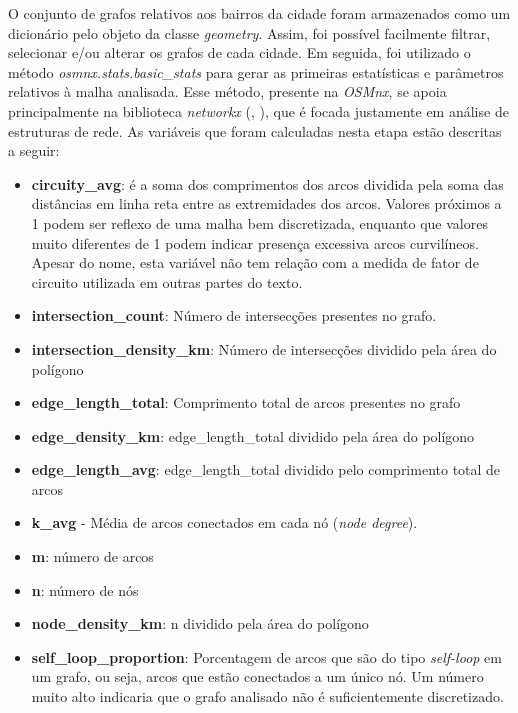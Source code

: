 O conjunto de grafos relativos aos bairros da cidade foram armazenados como um dicionário pelo objeto da classe \textit{geometry}.
Assim, foi possível facilmente filtrar, selecionar e/ou alterar os grafos de cada cidade.
Em seguida, foi utilizado o método \textit{osmnx.stats.basic\_stats} para gerar as primeiras estatísticas e parâmetros relativos à malha analisada.
Esse método, presente na \textit{OSMnx}, se apoia principalmente na biblioteca \textit{networkx} (, \citeyear{hagberg2008exploring}), que é focada justamente em análise de estruturas de rede.
%
As variáveis que foram calculadas nesta etapa estão descritas a seguir:
\begin{itemize}
    \item \textbf{circuity\_avg}: é a soma dos comprimentos dos arcos dividida pela soma das distâncias em linha reta entre as extremidades dos arcos. Valores próximos a 1 podem ser reflexo de uma malha bem discretizada, enquanto que valores muito diferentes de 1 podem indicar presença excessiva arcos curvilíneos. Apesar do nome, esta variável não tem relação com a medida de fator de circuito utilizada em outras partes do texto.
    \item \textbf{intersection\_count}: Número de intersecções presentes no grafo.
    \item \textbf{intersection\_density\_km}: Número de intersecções dividido pela área do polígono
    \item \textbf{edge\_length\_total}: Comprimento total de arcos presentes no grafo
    \item \textbf{edge\_density\_km}: edge\_length\_total dividido pela área do polígono
    \item \textbf{edge\_length\_avg}: edge\_length\_total dividido pelo comprimento total de arcos
    \item \textbf{k\_avg} - Média de arcos conectados em cada nó (\textit{node degree}).
    \item \textbf{m}: número de arcos
    \item \textbf{n}: número de nós
    \item \textbf{node\_density\_km}: n dividido pela área do polígono
    \item \textbf{self\_loop\_proportion}: Porcentagem de arcos que são do tipo \textit{self-loop} em um grafo, ou seja, arcos que estão conectados a um único nó. Um número muito alto indicaria que o grafo analisado não é suficientemente discretizado.

\end{itemize}
